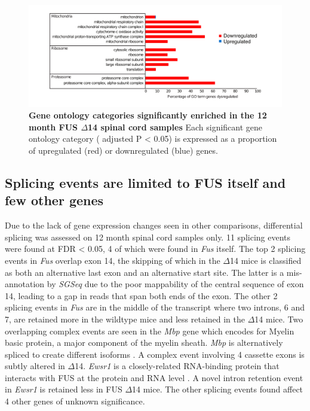 \begin{figure}[h!]
	\centering
	\includegraphics[width=\textwidth]{Figures/04_fus_mice/anny_GO_terms.png}
	\caption[Gene ontology categories in the 12 month spinal cord samples]{
		\textbf{Gene ontology categories significantly enriched in the 12 month FUS $\Delta$14 spinal cord samples}
		Each significant gene ontology category ( adjusted P < 0.05) is expressed as a proportion of upregulated (red) or downregulated (blue) genes.
	}
		\label{fig:delta14_go}
\end{figure}


\subsection{Splicing events are limited to FUS itself and few other genes}
Due to the lack of gene expression changes seen in other comparisons, differential splicing was assessed on 12 month spinal cord samples only.  
11 splicing events were found at FDR < 0.05, 4 of which were found in \textit{Fus} itself.
The top 2 splicing events in \textit{Fus} overlap exon 14, the skipping of which in the $\Delta$14 mice is classified as both an alternative last exon and an alternative start site.
The latter is a mis-annotation by \textit{SGSeq} due to the poor mappability of the central sequence of exon 14, leading to a gap in reads that span both ends of the exon.
The other 2 splicing events in \textit{Fus} are in the middle of the transcript where two introns, 6 and 7, are retained more in the wildtype mice and less retained in the $\Delta$14 mice.
Two overlapping complex events are seen in the \textit{Mbp} gene which encodes for Myelin basic protein, a major component of the myelin sheath. \textit{Mbp} is alternatively spliced to create different isoforms \citep{DeFerra1985}. A complex event involving 4 cassette exons is subtly altered in $\Delta$14.
\textit{Ewsr1} is a closely-related RNA-binding protein that interacts with FUS at the protein and RNA level \citep{Kapeli2016,Lagier-Tourenne2012}. 
A novel intron retention event in \textit{Ewsr1} is retained less in FUS $\Delta$14 mice.
The other splicing events found affect 4 other genes of unknown significance.

